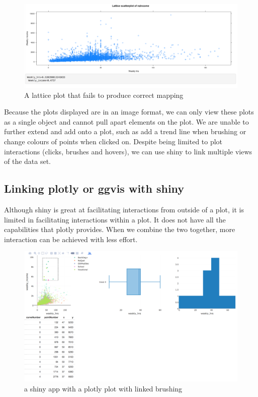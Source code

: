 \documentclass[11pt,]{report}
\begin{document}
\begin{figure}[H]

{\centering \includegraphics[width=0.6\linewidth,]{./fig/inc-shiny-2} 

}

\caption{\label{fig:inc-shiny-2} A lattice plot that fails to produce correct mapping}\label{fig:unnamed-chunk-22}
\end{figure}

Because the plots displayed are in an image format, we can only view
these plots as a single object and cannot pull apart elements on the
plot. We are unable to further extend and add onto a plot, such as add a
trend line when brushing or change colours of points when clicked on.
Despite being limited to plot interactions (clicks, brushes and hovers),
we can use \textsf{shiny} to link multiple views of the data set.

\subsection{Linking plotly or ggvis with
shiny}\label{linking-plotly-or-ggvis-with-shiny}

Although \textsf{shiny} is great at facilitating interactions from
outside of a plot, it is limited in facilitating interactions within a
plot. It does not have all the capabilities that \textsf{plotly}
provides. When we combine the two together, more interaction can be
achieved with less effort.

\begin{figure}[H]

{\centering \includegraphics[width=0.7\linewidth,]{./fig/inc-plotly-shiny} 

}

\caption{\label{fig:inc-plotly-shiny} a shiny app with a plotly plot with linked brushing}\label{fig:unnamed-chunk-24}
\end{figure}
\end{document}
